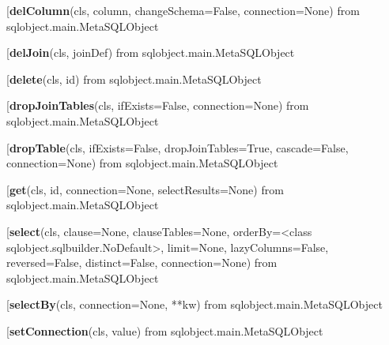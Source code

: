 \begin{description}\item[{\bf delColumn}(cls, column, changeSchema=False, connection=None) from sqlobject.main.MetaSQLObject\end{description}

\begin{description}\item[{\bf delJoin}(cls, joinDef) from sqlobject.main.MetaSQLObject\end{description}

\begin{description}\item[{\bf delete}(cls, id) from sqlobject.main.MetaSQLObject\end{description}

\begin{description}\item[{\bf dropJoinTables}(cls, ifExists=False, connection=None) from sqlobject.main.MetaSQLObject\end{description}

\begin{description}\item[{\bf dropTable}(cls, ifExists=False, dropJoinTables=True, cascade=False, connection=None) from sqlobject.main.MetaSQLObject\end{description}

\begin{description}\item[{\bf get}(cls, id, connection=None, selectResults=None) from sqlobject.main.MetaSQLObject\end{description}

\begin{description}\item[{\bf select}(cls, clause=None, clauseTables=None, orderBy=<class sqlobject.sqlbuilder.NoDefault>, limit=None, lazyColumns=False, reversed=False, distinct=False, connection=None) from sqlobject.main.MetaSQLObject\end{description}

\begin{description}\item[{\bf selectBy}(cls, connection=None, **kw) from sqlobject.main.MetaSQLObject\end{description}

\begin{description}\item[{\bf setConnection}(cls, value) from sqlobject.main.MetaSQLObject\end{description}

